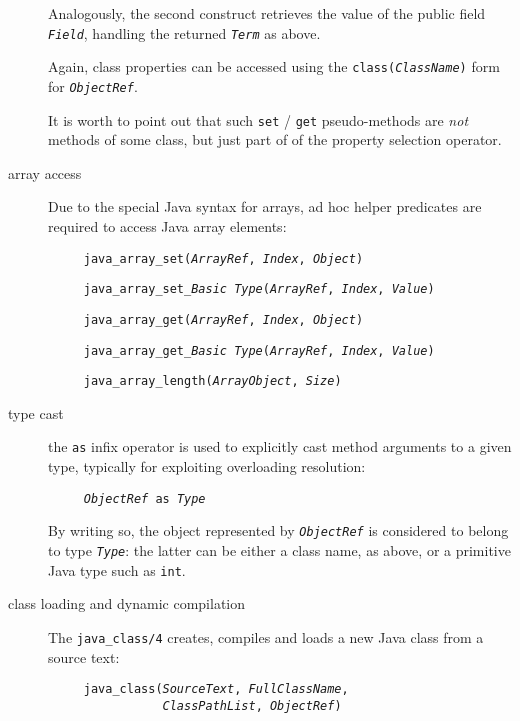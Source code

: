 \begin{description}
        Analogously, the second construct retrieves the value of the public field
        \texttt{\textit{Field}}, handling the returned \texttt{\textit{Term}} as above.

        Again, class properties can be accessed using the  \texttt{class(\textit{ClassName})} form for  \texttt{\textit{ObjectRef}}.

        It is worth to point out that such \texttt{set} / \texttt{get} 
        pseudo-methods are \textit{not} methods of some class, but just
        part of of the property selection operator.

  \item [array access]
        Due to the special Java syntax for arrays, ad hoc helper predicates are required to access Java array elements:
        
        \texttt{~~~~~java\_array\_set(\textit{ArrayRef}, \textit{Index}, \textit{Object})}
        
        \texttt{~~~~~java\_array\_set\_\textit{\emph{Basic Type}}(\textit{ArrayRef}, \textit{Index}, \textit{Value})}
        
        \texttt{~~~~~java\_array\_get(\textit{ArrayRef}, \textit{Index}, \textit{Object})}
        
        \texttt{~~~~~java\_array\_get\_\textit{\emph{Basic Type}}(\textit{ArrayRef}, \textit{Index}, \textit{Value})}
        
        \texttt{~~~~~java\_array\_length(\textit{ArrayObject}, \textit{Size})}

  \item [type cast]
        the \texttt{as} infix operator is used to explicitly cast method arguments to a given type, typically for exploiting overloading resolution:

        \texttt{~~~~~\textit{ObjectRef} as \textit{Type}}

        By writing so, the object represented by \texttt{\textit{ObjectRef}} is
        considered to belong to type \texttt{\textit{Type}}: the latter can be either a class name, as above, or a primitive Java type such as \texttt{int}.
        
  \item [class loading and dynamic compilation]
        The \texttt{java\_class/4} creates, compiles and loads a new Java class from a source text:
        
        \texttt{~~~~~java\_class(\textit{SourceText}, \textit{FullClassName},}\\
        \texttt{\mbox{~~~~~~~~~~~~~~~~}\textit{ClassPathList}, \textit{ObjectRef})}


\end{description}
